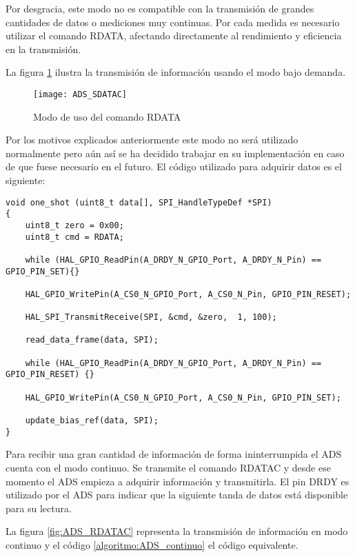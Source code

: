 Por desgracia, este modo no es compatible con la transmisión de grandes cantidades de datos o mediciones muy continuas. Por cada medida es necesario utilizar el comando \textsc{RDATA}, afectando directamente al rendimiento y eficiencia en la transmisión.

La figura \ref{fig:ADS_SDATAC} ilustra la transmisión de información usando el modo bajo demanda.

\begin{figure} [H]
    \centering
    \texttt{[image: ADS\_SDATAC]}
    \caption{Modo de uso del comando \textsc{RDATA}}
    \label{fig:ADS_SDATAC}
\end{figure}

Por los motivos explicados anteriormente este modo no será utilizado normalmente pero aún así se ha decidido trabajar en su implementación en caso de que fuese necesario en el futuro. El código utilizado para adquirir datos es el siguiente:

\begin{lstlisting}[label=algoritmo:ADS_oneshot,style = STM-code,frame=single,caption=Lectura de datos en modo \textit{one-shot}]
void one_shot (uint8_t data[], SPI_HandleTypeDef *SPI)
{
	uint8_t zero = 0x00;
	uint8_t cmd = RDATA;
			
	while (HAL_GPIO_ReadPin(A_DRDY_N_GPIO_Port, A_DRDY_N_Pin) == GPIO_PIN_SET){}

	HAL_GPIO_WritePin(A_CS0_N_GPIO_Port, A_CS0_N_Pin, GPIO_PIN_RESET);
	
	HAL_SPI_TransmitReceive(SPI, &cmd, &zero,  1, 100);

	read_data_frame(data, SPI);
			
	while (HAL_GPIO_ReadPin(A_DRDY_N_GPIO_Port, A_DRDY_N_Pin) == GPIO_PIN_RESET) {}			
				
	HAL_GPIO_WritePin(A_CS0_N_GPIO_Port, A_CS0_N_Pin, GPIO_PIN_SET);

	update_bias_ref(data, SPI);
}
\end{lstlisting}

Para recibir una gran cantidad de información de forma ininterrumpida el ADS cuenta con el modo continuo. Se transmite el comando \textsc{RDATAC} y desde ese momento el ADS empieza a adquirir información y transmitirla. El pin \textsc{DRDY} es utilizado por el ADS para indicar que la siguiente tanda de datos está disponible para su lectura. 

La figura \ref{fig:ADS_RDATAC} representa la transmisión de información en modo continuo y el código \ref{algoritmo:ADS_continuo} el código equivalente.

